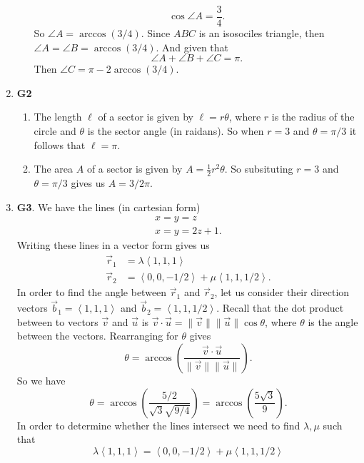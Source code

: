 \documentclass[12pt,oneside]{book}
\begin{document}
\begin{enumerate}
\begin{enumerate}
\[                \cos \angle A = \frac{3}{4}
            .\]  So $\angle A = \arccos(3/4)$. Since $ABC$ is an isosociles triangle, then $\angle A = \angle B = \arccos(3/4)$. And given that \[
                \angle A + \angle B + \angle C = \pi
            .\] Then $\angle C = \pi - 2\arccos(3/4)$.
        \end{enumerate}
        \item \textbf{G2} \begin{enumerate}
            \item The length $\ell$ of a sector is given by $\ell = r\theta$, where $r$ is the radius of the circle and $\theta$ is the sector angle (in raidans). So when $r = 3$ and $\theta = \pi/3$ it follows that $\ell = \pi$.
            \item The area $A$ of a sector is given by $A = \frac{1}{2} r^2 \theta$. So subsituting $r= 3$ and $\theta = \pi/3$ gives us $A = 3/2 \pi$.
        \end{enumerate}
        \item \textbf{G3}. We have the lines (in cartesian form) \begin{align*}
            x = y = z \\
            x = y = 2z + 1.
        \end{align*}
        Writing these lines in a vector form gives us \begin{align*}
            \vec{r}_1 &= \lambda \left\langle 1, 1, 1 \right\rangle \\
            \vec{r}_2 &= \left\langle 0, 0, -1/2 \right\rangle + \mu \left\langle 1, 1, 1/2 \right\rangle.
        \end{align*}
        In order to find the angle between $\vec{r}_1$ and $\vec{r}_2$, let us consider their direction vectors $\vec{b}_1 = \left\langle 1,1,1 \right\rangle$ and $\vec{b}_2 = \left\langle 1,1,1/2 \right\rangle$. Recall that the dot product between to vectors $\vec{v}$ and $\vec{u}$ is $\vec{v} \cdot \vec{u} = \| \vec{v} \| \| \vec{u} \| \cos \theta$, where $\theta$ is the angle between the vectors. Rearranging for $\theta$ gives \[
            \theta = \arccos \left( \frac{\vec{v} \cdot \vec{u}}{\| \vec{v} \| \| \vec{u} \|} \right)
        .\] 
        So we have \[
            \theta = \arccos \left( \frac{5/2}{\sqrt{3} \sqrt{9/4} } \right) = \arccos \left( \frac{5 \sqrt{3}}{9} \right)
        .\] 
        In order to determine whether the lines intersect we need to find $\lambda, \mu$ such that \[
            \lambda \left\langle 1,1,1 \right\rangle = \left\langle 0,0,-1/2 \right\rangle + \mu \left\langle 1,1,1/2 \right\rangle
\]
\end{enumerate}
\end{document}
